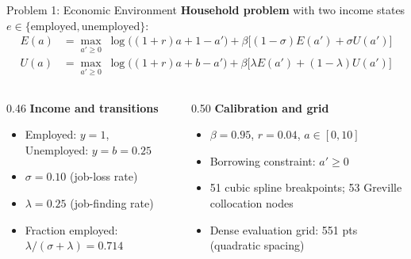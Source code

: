 \documentclass[aspectratio=169,11pt]{beamer}
\begin{document}
\begin{frame}{Problem 1: Economic Environment}
    \textbf{Household problem} with two income states $e \in \{\text{employed},\text{unemployed}\}$:
    \[
    \begin{aligned}
    E(a) &= \max_{a'\ge 0}\; \log\bigl((1+r)a + 1 - a'\bigr) + \beta\bigl[(1-\sigma)E(a') + \sigma U(a')\bigr] \\[3pt]
    U(a) &= \max_{a'\ge 0}\; \log\bigl((1+r)a + b - a'\bigr) + \beta\bigl[\lambda E(a') + (1-\lambda)U(a')\bigr]
    \end{aligned}
    \]

    \vspace{0.3em}
    \begin{columns}[T]
        \begin{column}{0.46\textwidth}
            \textbf{Income and transitions}
            \begin{itemize}\setlength\itemsep{0.1em}
                \item Employed: $y=1$, Unemployed: $y=b=0.25$
                \item $\sigma=0.10$ (job-loss rate)
                \item $\lambda=0.25$ (job-finding rate)
                \item Fraction employed: $\lambda/(\sigma+\lambda)=0.714$
            \end{itemize}
        \end{column}
        \begin{column}{0.50\textwidth}
            \textbf{Calibration and grid}
            \begin{itemize}\setlength\itemsep{0.1em}
                \item $\beta=0.95$, $r=0.04$, $a\in[0,10]$
                \item Borrowing constraint: $a'\ge 0$
                \item 51 cubic spline breakpoints; 53 Greville collocation nodes
                \item Dense evaluation grid: 551 pts (quadratic spacing)
            \end{itemize}
        \end{column}
    \end{columns}
\end{frame}
\end{document}
